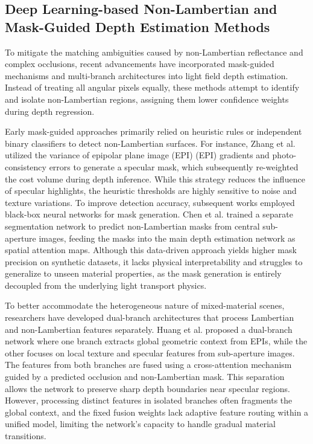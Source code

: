 \subsection{Deep Learning-based Non-Lambertian and Mask-Guided Depth Estimation Methods}

To mitigate the matching ambiguities caused by non-Lambertian reflectance and complex occlusions, recent advancements have incorporated mask-guided mechanisms and multi-branch architectures into light field depth estimation. Instead of treating all angular pixels equally, these methods attempt to identify and isolate non-Lambertian regions, assigning them lower confidence weights during depth regression.

Early mask-guided approaches primarily relied on heuristic rules or independent binary classifiers to detect non-Lambertian surfaces. For instance, Zhang et al. utilized the variance of epipolar plane image (EPI) (EPI) gradients and photo-consistency errors to generate a specular mask, which subsequently re-weighted the cost volume during depth inference. While this strategy reduces the influence of specular highlights, the heuristic thresholds are highly sensitive to noise and texture variations. To improve detection accuracy, subsequent works employed black-box neural networks for mask generation. Chen et al. trained a separate segmentation network to predict non-Lambertian masks from central sub-aperture images, feeding the masks into the main depth estimation network as spatial attention maps. Although this data-driven approach yields higher mask precision on synthetic datasets, it lacks physical interpretability and struggles to generalize to unseen material properties, as the mask generation is entirely decoupled from the underlying light transport physics.

To better accommodate the heterogeneous nature of mixed-material scenes, researchers have developed dual-branch architectures that process Lambertian and non-Lambertian features separately. Huang et al. proposed a dual-branch network where one branch extracts global geometric context from EPIs, while the other focuses on local texture and specular features from sub-aperture images. The features from both branches are fused using a cross-attention mechanism guided by a predicted occlusion and non-Lambertian mask. This separation allows the network to preserve sharp depth boundaries near specular regions. However, processing distinct features in isolated branches often fragments the global context, and the fixed fusion weights lack adaptive feature routing within a unified model, limiting the network's capacity to handle gradual material transitions.

